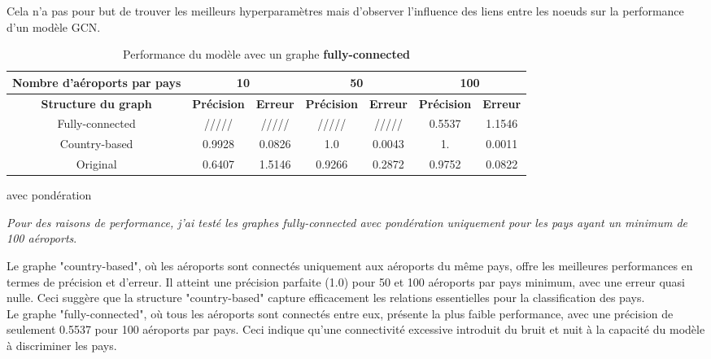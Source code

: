 Cela n'a pas pour but de trouver les meilleurs hyperparamètres mais d'observer
l'influence des liens entre les noeuds sur la performance d'un modèle GCN.\\

\begin{table}[h!]
    \centering

    \begin{tabular}{|c||c|c|c|c|c|c|}
        \hline
        \textbf{Nombre d'aéroports par pays} & \multicolumn{2}{c|}{10} & \multicolumn{2}{c|}{50} & \multicolumn{2}{c|}{100}                                                          \\ \hline \hline
        \textbf{Structure du graph}          & \textbf{Précision}      & \textbf{Erreur}         & \textbf{Précision}       & \textbf{Erreur} & \textbf{Précision} & \textbf{Erreur} \\ \hline
        Fully-connected                      & /////                   & /////                   & /////                    & /////           & 0.5537             & 1.1546          \\ \hline
        Country-based                        & 0.9928                  & 0.0826                  & 1.0                      & 0.0043          & 1.                 & 0.0011          \\ \hline
        Original                             & 0.6407                  & 1.5146                  & 0.9266                   & 0.2872          & 0.9752             & 0.0822          \\ \hline
    \end{tabular}
    \caption{Performance du modèle avec un graphe \textbf{fully-connected}} avec pondération
\end{table}

\textit{Pour des raisons de performance, j'ai testé les graphes fully-connected avec pondération uniquement pour les pays ayant un minimum de 100 aéroports}.

Le graphe "country-based", où les aéroports sont connectés uniquement aux
aéroports du même pays, offre les meilleures performances en termes de
précision et d'erreur. Il atteint une précision parfaite (1.0) pour 50 et 100
aéroports par pays minimum, avec une erreur quasi nulle. Ceci suggère que la
structure "country-based" capture efficacement les relations essentielles pour
la classification des pays.\\

Le graphe "fully-connected", où tous les aéroports sont connectés entre eux,
présente la plus faible performance, avec une précision de seulement 0.5537
pour 100 aéroports par pays. Ceci indique qu'une connectivité excessive
introduit du bruit et nuit à la capacité du modèle à discriminer les pays.\\

